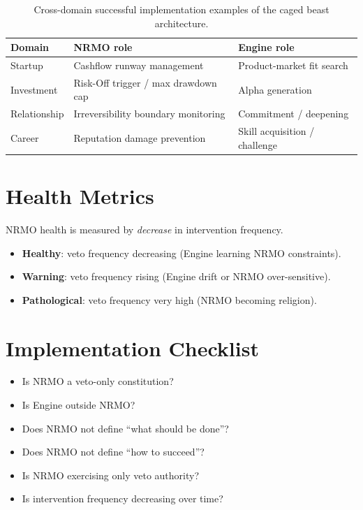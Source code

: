 \begin{table}[ht]
\centering
\small
\begin{tabularx}{\linewidth}{lXX}
\toprule
\textbf{Domain} & \textbf{NRMO role} & \textbf{Engine role} \\
\midrule

Startup
& Cashflow runway management
& Product-market fit search \\

Investment
& Risk-Off trigger / max drawdown cap
& Alpha generation \\

Relationship
& Irreversibility boundary monitoring
& Commitment / deepening \\

Career
& Reputation damage prevention
& Skill acquisition / challenge \\

\bottomrule
\end{tabularx}
\caption[Strong engine cross-domain examples]{Cross-domain successful
implementation examples of the caged beast architecture.}
\label{tab:strong-engine-examples}
\end{table}

\section{Health Metrics}
\label{sec:strong-engine-health}

NRMO health is measured by \emph{decrease} in intervention
frequency.

\begin{itemize}
\item \textbf{Healthy}: veto frequency decreasing
(Engine learning NRMO constraints).
\item \textbf{Warning}: veto frequency rising (Engine drift or NRMO
over-sensitive).
\item \textbf{Pathological}: veto frequency very high (NRMO becoming
religion).
\end{itemize}

\section{Implementation Checklist}
\label{sec:strong-engine-checklist}

\begin{itemize}
\item[$\square$] Is NRMO a veto-only constitution?
\item[$\square$] Is Engine outside NRMO?
\item[$\square$] Does NRMO not define ``what should be done''?
\item[$\square$] Does NRMO not define ``how to succeed''?
\item[$\square$] Is NRMO exercising only veto authority?
\item[$\square$] Is intervention frequency decreasing over time?
\end{itemize}

